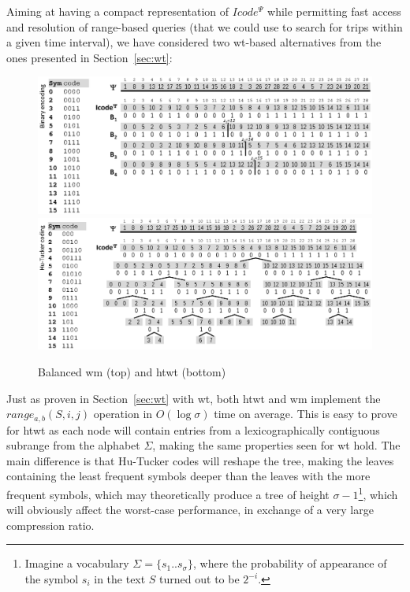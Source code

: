 	Aiming at having a compact representation of $Icode^{\Psi}$ while permitting fast 
	access and resolution of range-based queries (that we could use to search for trips within 
	a given time interval), we have considered two \gls{wt}-based alternatives from the ones 
	presented in Section~\ref{sec:wt}:

	\begin{figure}[htb]
		\begin{center}
			{\includegraphics[width=1.0\textwidth]{figures/wma.eps}}
			{\includegraphics[width=1.0\textwidth]{figures/wta.eps}}
		\end{center}
		\caption{Balanced \acrlong{wm} (top) and \acrlong{htwt} (bottom)}
		\label{fig:wtwm}
	\end{figure}


	Just as proven in Section~\ref{sec:wt} with \gls{wt}, both \gls{htwt} and \gls{wm} implement the $range_{a,b}(S,i,j)$ operation in $O(\log\sigma)$ time on average. This is easy to prove for \gls{htwt} as each node will contain entries from a lexicographically contiguous subrange from the alphabet $\Sigma$, making the same properties seen for \gls{wt} hold. The main difference is that Hu-Tucker codes will reshape the tree, making the leaves containing the least frequent symbols deeper than the leaves with the more frequent symbols, which may theoretically produce a tree of height $\sigma-1$\footnote{Imagine a vocabulary $\Sigma=\{s_1..s_\sigma\}$, where the probability of appearance of the symbol $s_i$ in the text $S$ turned out to be $2^{-i}$.}, which will obviously affect the worst-case performance, in exchange of a very large compression ratio.

